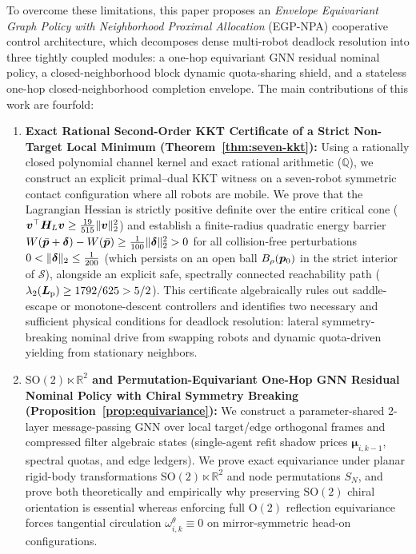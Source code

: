 To overcome these limitations, this paper proposes an \emph{Envelope Equivariant Graph Policy with Neighborhood Proximal Allocation} (EGP-NPA) cooperative control architecture, which decomposes dense multi-robot deadlock resolution into three tightly coupled modules: a one-hop equivariant GNN residual nominal policy, a closed-neighborhood block dynamic quota-sharing shield, and a stateless one-hop closed-neighborhood completion envelope. The main contributions of this work are fourfold:
\begin{enumerate}
 \item \textbf{Exact Rational Second-Order KKT Certificate of a Strict Non-Target Local Minimum (Theorem~\ref{thm:seven-kkt}):} Using a rationally closed polynomial channel kernel and exact rational arithmetic ($\mathbb Q$), we construct an explicit primal--dual KKT witness on a seven-robot symmetric contact configuration where all robots are mobile. We prove that the Lagrangian Hessian is strictly positive definite over the entire critical cone ($\boldsymbol v^{\top}\boldsymbol H_L\boldsymbol v\ge\frac{19}{515}\lVert\boldsymbol v\rVert_2^2$) and establish a finite-radius quadratic energy barrier $W(\bar{\boldsymbol{p}}+\boldsymbol\delta)-W(\bar{\boldsymbol{p}})\ge\frac1{100}\lVert\boldsymbol\delta\rVert_2^2>0$ for all collision-free perturbations $0<\lVert\boldsymbol\delta\rVert_2\le\frac1{200}$ (which persists on an open ball $B_\rho(\boldsymbol{p}_0)$ in the strict interior of $\mathcal S$), alongside an explicit safe, spectrally connected reachability path ($\lambda_2(\boldsymbol{L}_{\mathrm{p}})\ge 1792/625>5/2$). This certificate algebraically rules out saddle-escape or monotone-descent controllers and identifies two necessary and sufficient physical conditions for deadlock resolution: lateral symmetry-breaking nominal drive from swapping robots and dynamic quota-driven yielding from stationary neighbors.
 \item \textbf{$\mathrm{SO}(2)\ltimes\mathbb R^2$ and Permutation-Equivariant One-Hop GNN Residual Nominal Policy with Chiral Symmetry Breaking (Proposition~\ref{prop:equivariance}):} We construct a parameter-shared 2-layer message-passing GNN over local target/edge orthogonal frames and compressed filter algebraic states (single-agent refit shadow prices $\boldsymbol\mu_{i,k-1}$, spectral quotas, and edge ledgers). We prove exact equivariance under planar rigid-body transformations $\mathrm{SO}(2)\ltimes\mathbb R^2$ and node permutations $S_N$, and prove both theoretically and empirically why preserving $\mathrm{SO}(2)$ chiral orientation is essential whereas enforcing full $\mathrm{O}(2)$ reflection equivariance forces tangential circulation $\omega_{i,k}^\theta\equiv 0$ on mirror-symmetric head-on configurations.

\end{enumerate}
